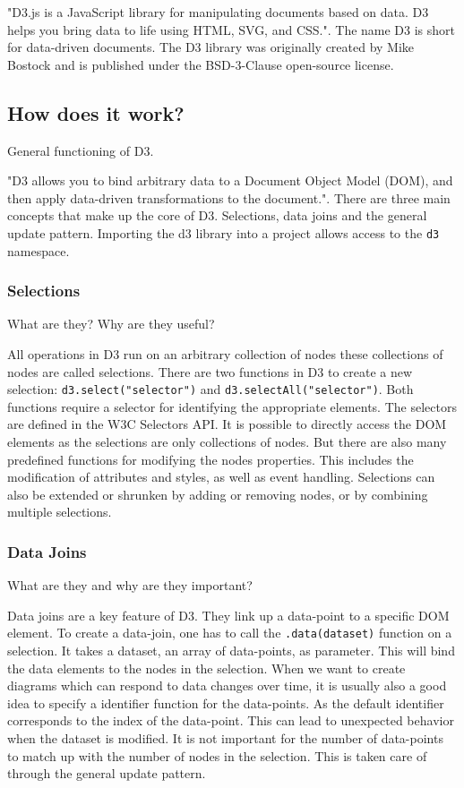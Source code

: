 "D3.js is a JavaScript library for manipulating documents based on data. D3 helps you bring data to life using HTML, SVG, and CSS."\cite{d3js}. The name D3 is short for data-driven documents. The D3 library was originally created by Mike Bostock and is published under the BSD-3-Clause open-source license.

\subsection{How does it work?}
General functioning of D3.

"D3 allows you to bind arbitrary data to a Document Object Model (DOM), and then apply data-driven transformations to the document."\cite{d3js}. There are three main concepts that make up the core of D3. Selections, data joins and the general update pattern. Importing the d3 library into a project allows access to the \verb|d3| namespace.

\subsubsection{Selections}
What are they? Why are they useful?

All operations in D3 run on an arbitrary collection of nodes these collections of nodes are called selections. There are two functions in D3 to create a new selection: \verb|d3.select("selector")| and \verb|d3.selectAll("selector")|. Both functions require a selector for identifying the appropriate elements. The selectors are defined in the W3C Selectors API\cite{w3c_selectors_api}. It is possible to directly access the DOM elements as the selections are only collections of nodes. But there are also many predefined functions for modifying the nodes properties. This includes the modification of attributes and styles, as well as event handling. Selections can also be extended or shrunken by adding or removing nodes, or by combining multiple selections.

\subsubsection{Data Joins}
What are they and why are they important?

Data joins are a key feature of D3. They link up a data-point to a specific DOM element. To create a data-join, one has to call the \verb|.data(dataset)| function on a selection. It takes a dataset, an array of data-points, as parameter. This will bind the data elements to the nodes in the selection. When we want to create diagrams which can respond to data changes over time, it is usually also a good idea to specify a identifier function for the data-points. As the default identifier corresponds to the index of the data-point. This can lead to unexpected behavior when the dataset is modified. It is not important for the number of data-points to match up with the number of nodes in the selection. This is taken care of through the general update pattern.

